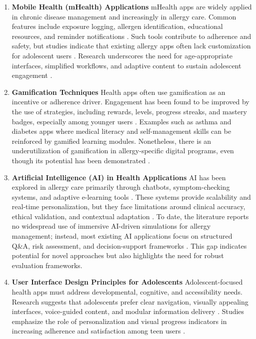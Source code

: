 \documentclass[MScCS]{uccthesis}
\begin{document}
\begin{enumerate}
    \item \textbf{Mobile Health (mHealth) Applications}  
    mHealth apps are widely applied in chronic disease management and increasingly in allergy care. Common features include exposure logging, allergen identification, educational resources, and reminder notifications \cite{matricardi2020mhealth}. Such tools contribute to adherence and safety, but studies indicate that existing allergy apps often lack customization for adolescent users \cite{virella2019mobile}. Research underscores the need for age-appropriate interfaces, simplified workflows, and adaptive content to sustain adolescent engagement \cite{sullivan2024telehealth}.  

    \item \textbf{Gamification Techniques}  
    Health apps often use gamification as an incentive or adherence driver. Engagement has been found to be improved by the use of strategies, including rewards, levels, progress streaks, and mastery badges, especially among younger users \cite{gajardo2023gamification, tran2022gamification}. Examples such as asthma and diabetes apps where medical literacy and self-management skills can be reinforced by gamified learning modules. Nonetheless, there is an underutilization of gamification in allergy-specific digital programs, even though its potential has been demonstrated \cite{broome2021fasst}.

    \item \textbf{Artificial Intelligence (AI) in Health Applications}  
    AI has been explored in allergy care primarily through chatbots, symptom-checking systems, and adaptive e-learning tools \cite{macmath2023ai}. These systems provide scalability and real-time personalization, but they face limitations around clinical accuracy, ethical validation, and contextual adaptation \cite{bajowala2022telehealth}. To date, the literature reports no widespread use of immersive AI-driven simulations for allergy management; instead, most existing AI applications focus on structured Q\&A, risk assessment, and decision-support frameworks \cite{majeed2015apps, sullivan2024telehealth}. This gap indicates potential for novel approaches but also highlights the need for robust evaluation frameworks.  

    \item \textbf{User Interface Design Principles for Adolescents}  
    Adolescent-focused health apps must address developmental, cognitive, and accessibility needs. Research suggests that adolescents prefer clear navigation, visually appealing interfaces, voice-guided content, and modular information delivery \cite{kwen2022foodallergy}. Studies emphasize the role of personalization and visual progress indicators in increasing adherence and satisfaction among teen users \cite{perez2019mobile}.  


\end{enumerate}
\end{document}
